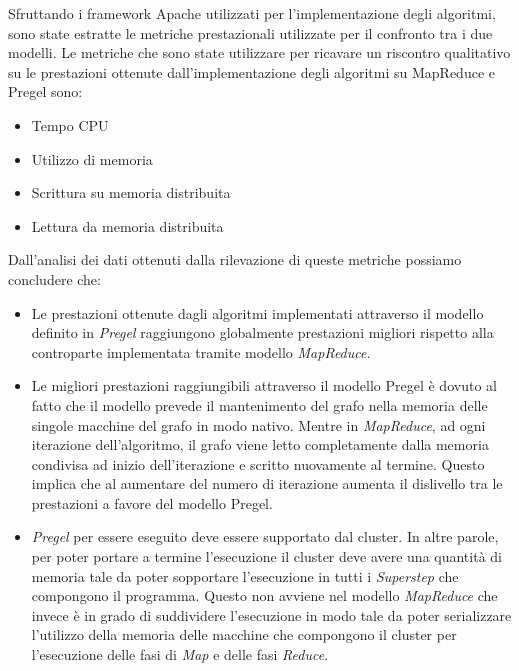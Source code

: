 \documentclass[LaM,binding=0.6cm]{sapthesis}
\begin{document}
Sfruttando i framework Apache utilizzati per l'implementazione degli algoritmi, sono state estratte le metriche prestazionali utilizzate per il confronto tra i due modelli.
Le metriche che sono state utilizzare per ricavare un riscontro qualitativo su le prestazioni ottenute dall'implementazione degli algoritmi su MapReduce e Pregel sono: 

\begin{itemize}
\item Tempo CPU
\item Utilizzo di memoria
\item Scrittura su memoria distribuita
\item Lettura da memoria distribuita
\end{itemize}


Dall'analisi dei dati ottenuti dalla rilevazione di queste metriche possiamo concludere che:
\begin{itemize}
\item Le prestazioni ottenute dagli algoritmi implementati attraverso il modello definito in \textit{Pregel} raggiungono globalmente prestazioni migliori rispetto alla controparte implementata tramite modello \textit{MapReduce}. 
\item Le migliori prestazioni raggiungibili attraverso il modello Pregel è dovuto al fatto che il modello prevede il mantenimento del grafo nella memoria delle singole macchine del grafo in modo nativo.  Mentre in \textit{MapReduce}, ad ogni iterazione dell'algoritmo, il grafo viene letto completamente dalla memoria condivisa ad inizio dell'iterazione e scritto nuovamente al termine. Questo implica che al aumentare del numero di iterazione aumenta il dislivello tra le prestazioni a favore del modello Pregel.
\item \textit{Pregel} per essere eseguito deve essere supportato dal cluster. In altre parole, per poter portare a termine l'esecuzione il cluster deve avere una quantità di memoria tale da poter sopportare l'esecuzione in tutti i \textit{Superstep }che compongono il programma. Questo non avviene nel modello \textit{MapReduce} che invece è in grado di suddividere l'esecuzione in modo tale da poter serializzare l'utilizzo della memoria delle macchine che compongono il cluster per l'esecuzione delle fasi di \textit{Map} e delle fasi \textit{Reduce}.
\end{itemize}









\cleardoublepage
{}




\listoffigures

\listoftables
\end{document}

